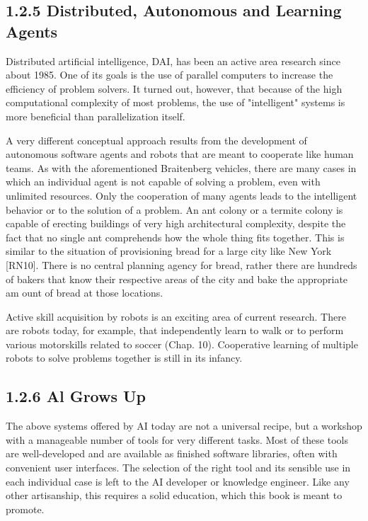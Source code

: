 \documentclass[10pt]{article}
\begin{document}
\subsection*{1.2.5 Distributed, Autonomous and Learning Agents}
Distributed artificial intelligence, DAI, has been an active area research since about 1985. One of its goals is the use of parallel computers to increase the efficiency of problem solvers. It turned out, however, that because of the high computational complexity of most problems, the use of "intelligent" systems is more beneficial than parallelization itself.

A very different conceptual approach results from the development of autonomous software agents and robots that are meant to cooperate like human teams. As with the aforementioned Braitenberg vehicles, there are many cases in which an individual agent is not capable of solving a problem, even with unlimited resources. Only the cooperation of many agents leads to the intelligent behavior or to the solution of a problem. An ant colony or a termite colony is capable of erecting buildings of very high architectural complexity, despite the fact that no single ant comprehends how the whole thing fits together. This is similar to the situation of provisioning bread for a large city like New York [RN10]. There is no central planning agency for bread, rather there are hundreds of bakers that know their respective areas of the city and bake the appropriate am
ount of bread at those locations.

Active skill acquisition by robots is an exciting area of current research. There are robots today, for example, that independently learn to walk or to perform\\
various motorskills related to soccer (Chap. 10). Cooperative learning of multiple robots to solve problems together is still in its infancy.

\subsection*{1.2.6 Al Grows Up}
The above systems offered by AI today are not a universal recipe, but a workshop with a manageable number of tools for very different tasks. Most of these tools are well-developed and are available as finished software libraries, often with convenient user interfaces. The selection of the right tool and its sensible use in each individual case is left to the AI developer or knowledge engineer. Like any other artisanship, this requires a solid education, which this book is meant to promote.
\end{document}
